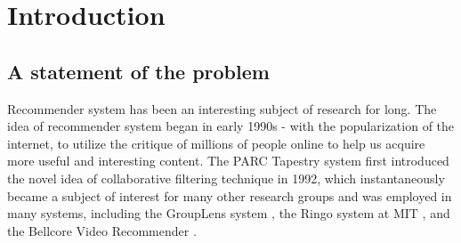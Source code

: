 
\chapter{Introduction} %

\label{Chapter1} %


\newcommand{\keyword}[1]{\textbf{#1}}
\newcommand{\tabhead}[1]{\textbf{#1}}
\newcommand{\code}[1]{\texttt{#1}}
\newcommand{\file}[1]{\texttt{\bfseries#1}}
\newcommand{\option}[1]{\texttt{\itshape#1}}


\section{A statement of the problem}
Recommender system has been an interesting subject of research for long. The idea of recommender system began in early 1990s - with the popularization of the internet, to utilize the critique of millions of people online to help us acquire more useful and interesting content. The PARC Tapestry system \cite{goldberg1992using} first introduced the novel idea of collaborative filtering technique in 1992, which instantaneously became a subject of interest for many other research groups and was employed in many systems, including the GroupLens system \cite{resnick1994open}, the Ringo system at MIT \cite{shardanand1995social}, and the Bellcore Video Recommender \cite{hill1995recommending}.



